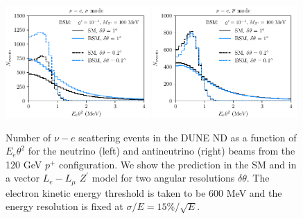 \begin{figure}[t]
%
\centering
%
\includegraphics[width=0.49\textwidth]{Etheta2_nu_new.pdf}
\includegraphics[width=0.49\textwidth]{Etheta2_nubar_new.pdf}
%
\caption[Kinematical distributions in $E\theta^2$ for neutrino-electron scattering.]{Number of $\nu-e$ scattering events in the DUNE ND as a function of $E_e\theta^2$ for the neutrino (left) and antineutrino (right) beams from the 120 GeV $p^+$ configuration. We show the prediction in the SM and in a vector $L_e-L_\mu$ $Z^\prime$ model for two angular resolutions $\delta\theta$. The electron kinetic energy threshold is taken to be $600$ MeV and the energy resolution is fixed at $\sigma/E = 15\%/\sqrt{E}$. \label{fig:nuedist}}
%
\end{figure}


